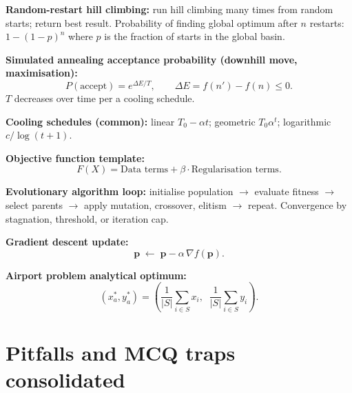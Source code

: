 \documentclass[11pt, a4paper]{article}
\begin{document}
\textbf{Random-restart hill climbing:} run hill climbing many times from random starts; return best result. Probability of finding global optimum after $n$ restarts: $1 - (1-p)^n$ where $p$ is the fraction of starts in the global basin.

\textbf{Simulated annealing acceptance probability (downhill move, maximisation):}
\[
P(\text{accept}) = e^{\Delta E / T}, \qquad \Delta E = f(n') - f(n) \le 0.
\]
$T$ decreases over time per a cooling schedule.

\textbf{Cooling schedules (common):} linear $T_0 - \alpha t$; geometric $T_0 \alpha^t$; logarithmic $c / \log(t+1)$.

\textbf{Objective function template:}
\[
F(X) = \text{Data terms} + \beta \cdot \text{Regularisation terms}.
\]

\textbf{Evolutionary algorithm loop:} initialise population $\to$ evaluate fitness $\to$ select parents $\to$ apply mutation, crossover, elitism $\to$ repeat. Convergence by stagnation, threshold, or iteration cap.

\textbf{Gradient descent update:}
\[
\mathbf{p} \;\leftarrow\; \mathbf{p} - \alpha \, \nabla f(\mathbf{p}).
\]

\textbf{Airport problem analytical optimum:}
\[
(x_a^*, y_a^*) = \left(\frac{1}{|S|} \sum_{i \in S} x_i, \;\; \frac{1}{|S|} \sum_{i \in S} y_i\right).
\]

\section*{Pitfalls and MCQ traps consolidated}
\end{document}
